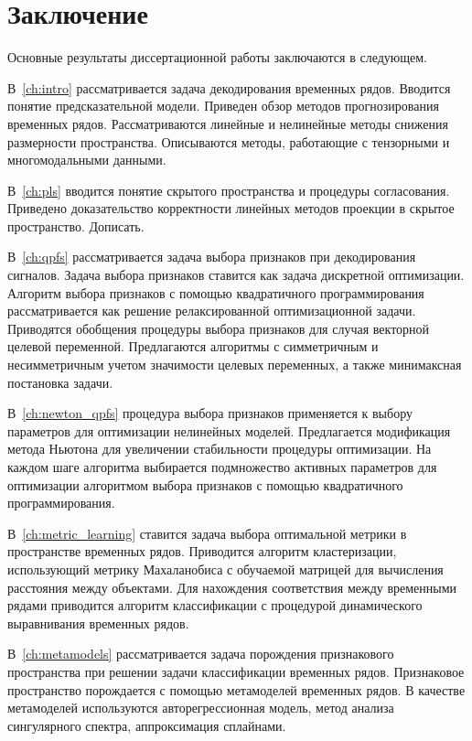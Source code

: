 \chapter*{Заключение}

Основные результаты диссертационной работы заключаются в следующем.

В~\autoref{ch:intro} рассматривается задача декодирования временных рядов.
Вводится понятие предсказательной модели.
Приведен обзор методов прогнозирования временных рядов.
Рассматриваются линейные и нелинейные методы снижения размерности пространства.
Описываются методы, работающие с тензорными и многомодальными данными.

В~\autoref{ch:pls} вводится понятие скрытого пространства и процедуры согласования.
Приведено доказательство корректности линейных методов проекции в скрытое пространство. {\color{red} Дописать.}

В~\autoref{ch:qpfs} рассматривается задача выбора признаков при декодирования сигналов.
Задача выбора признаков ставится как задача дискретной оптимизации. 
Алгоритм выбора признаков с помощью квадратичного программирования рассматривается как решение релаксированной оптимизационной задачи.
Приводятся обобщения процедуры выбора признаков для случая векторной целевой переменной.
Предлагаются алгоритмы с симметричным и несимметричным учетом значимости целевых переменных, а также минимаксная постановка задачи.

В~\autoref{ch:newton_qpfs} процедура выбора признаков применяется к выбору параметров для оптимизации нелинейных моделей.
Предлагается модификация метода Ньютона для увеличении стабильности процедуры оптимизации.
На каждом шаге алгоритма выбирается подмножество активных параметров для оптимизации алгоритмом выбора признаков с помощью квадратичного программирования.

В~\autoref{ch:metric_learning} ставится задача выбора оптимальной метрики в пространстве временных рядов.
Приводится алгоритм кластеризации, использующий метрику Махаланобиса с обучаемой матрицей для вычисления расстояния между объектами. 
Для нахождения соответствия между временными рядами приводится алгоритм классификации с процедурой динамического выравнивания временных рядов.

В~\autoref{ch:metamodels} рассматривается задача порождения признакового пространства при решении задачи классификации временных рядов.
Признаковое пространство порождается с помощью метамоделей временных рядов.
В качестве метамоделей используются авторегрессионная модель, метод анализа сингулярного спектра, аппроксимация сплайнами.